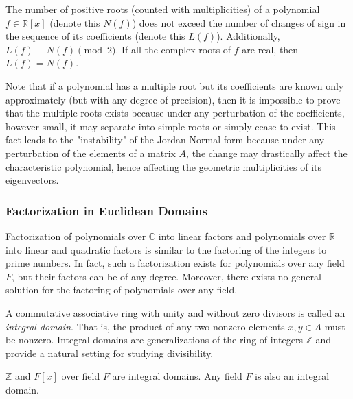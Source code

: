 \documentclass{article}
\begin{document}
      \begin{theorem}
        The number of positive roots (counted with multiplicities) of a polynomial $f \in \mathbb{R}[x]$ (denote this $N(f)$) does not exceed the number of changes of sign in the sequence of its coefficients (denote this $L(f)$). Additionally, $L(f) \equiv N(f) \pmod{2}$. If all the complex roots of $f$ are real, then $L(f) = N(f)$. 
      \end{theorem}

      Note that if a polynomial has a multiple root but its coefficients are known only approximately (but with any degree of precision), then it is impossible to prove that the multiple roots exists because under any perturbation of the coefficients, however small, it may separate into simple roots or simply cease to exist. This fact leads to the "instability" of the Jordan Normal form because under any perturbation of the elements of a matrix $A$, the change may drastically affect the characteristic polynomial, hence affecting the geometric multiplicities of its eigenvectors. 

    \subsubsection{Factorization in Euclidean Domains}

      Factorization of polynomials over $\mathbb{C}$ into linear factors and polynomials over $\mathbb{R}$ into linear and quadratic factors is similar to the factoring of the integers to prime numbers. In fact, such a factorization exists for polynomials over any field $F$, but their factors can be of any degree. Moreover, there exists no general solution for the factoring of polynomials over any field. 

      \begin{definition}
        A commutative associative ring with unity and without zero divisors is called an \textit{integral domain}. That is, the product of any two nonzero elements $x, y \in A$ must be nonzero. Integral domains are generalizations of the ring of integers $\mathbb{Z}$ and provide a natural setting for studying divisibility. 
      \end{definition}

      \begin{example}
        $\mathbb{Z}$ and $F[x]$ over field $F$ are integral domains. Any field $F$ is also an integral domain. 
      \end{example}
\end{document}
